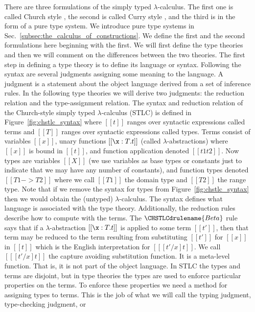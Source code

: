 There are three formulations of the simply typed $\lambda$-calculus.
The first one is called Church style
\cite{Girard:1989,Barendregt:1992,Church:1940}, the second is called
Curry style \cite{Barendregt:1992,Reynolds:1998}, and the third is in
the form of a pure type system.  We introduce pure type systems in
Sec.~\ref{subsec:the_calculus_of_constructions}.  We define the first
and the second formulations here beginning with the first.  We will
first define the type theories and then we will comment on the
differences between the two theories.  The first step in defining a
type theory is to define its language or syntax.  Following the syntax
are several judgments assigning some meaning to the language.  A
judgment is a statement about the object language derived from a set
of inference rules.  In the following type theories we will derive two
judgments: the reduction relation and the type-assignment relation.
The syntax and reduction relation of the Church-style simply typed
$\lambda$-calculus (STLC) is defined in Figure~\ref{fig:chstlc_syntax}
where $[[t]]$ ranges over syntactic expressions called terms and
$[[T]]$ ranges over syntactic expressions called types. Terms consist
of variables $[[x]]$, unary functions $[[\x:T.t]]$ (called
$\lambda$-abstractions) where $[[x]]$ is bound in $[[t]]$, and
function application denoted $[[t1 t2]]$.  Now types are variables
$[[X]]$ (we use variables as base types or constants just to indicate
that we may have any number of constants), and function types denoted
$[[T1 -> T2]]$ where we call $[[T1]]$ the domain type and $[[T2]]$ the
range type.  Note that if we remove the syntax for types from
Figure~\ref{fig:chstlc_syntax} then we would obtain the (untyped)
$\lambda$-calculus.  The syntax defines what language is associated
with the type theory.  Additionally, the reduction rules describe how
to compute with the terms.  The $\CHSTLCdrulename{Beta}$ rule says
that if a $\lambda$-abstraction $[[\x:T.t]]$ is applied to some term
$[[t']]$, then that term may be reduced to the term resulting from
substituting $[[t']]$ for $[[x]]$ in $[[t]]$ which is the English
interpretation for $[[ [t'/x]t]]$. We call $[[ [t'/x] t]]$ the capture
avoiding substitution function. It is a meta-level function. That is,
it is not part of the object language. In STLC the types and terms are
disjoint, but in type theories the types are used to enforce
particular properties on the terms.  To enforce these properties we
need a method for assigning types to terms.  This is the job of what
we will call the typing judgment, type-checking judgment, or

